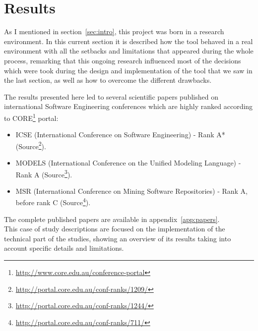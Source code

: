 \documentclass[a4paper, 12pt]{book}
\begin{document}
\chapter{Results}
\label{sec:results}
As I mentioned in section~\ref{sec:intro}, this project was born in a research environment.
In this current section it is described how the tool behaved in a real environment with all the setbacks
and limitations that appeared during the whole process, remarking that this ongoing research
influenced most of the decisions which were took during the design and implementation
of the tool that we saw in the last section, as well as how to overcome the different drawbacks.\par
The results presented here led to several scientific papers published on international Software Engineering
conferences which are highly ranked according to CORE\footnote{\url{http://www.core.edu.au/conference-portal}} portal:
\begin{itemize}
    \item ICSE (International Conference on Software Engineering) - Rank A* (Source\footnote{\url{http://portal.core.edu.au/conf-ranks/1209/}}).
    \item MODELS (International Conference on the Unified Modeling Language) - Rank A (Source\footnote{\url{http://portal.core.edu.au/conf-ranks/1244/}}).
    \item MSR (International Conference on Mining Software Repositories) - Rank A, before rank C (Source\footnote{\url{http://portal.core.edu.au/conf-ranks/711/}}).
\end{itemize}
The complete published papers are available in appendix~\ref{app:papers}.
\\This case of study descriptions are focused on the implementation of the technical part of the studies,
showing an overview of its results taking into account specific details and limitations.
\end{document}
